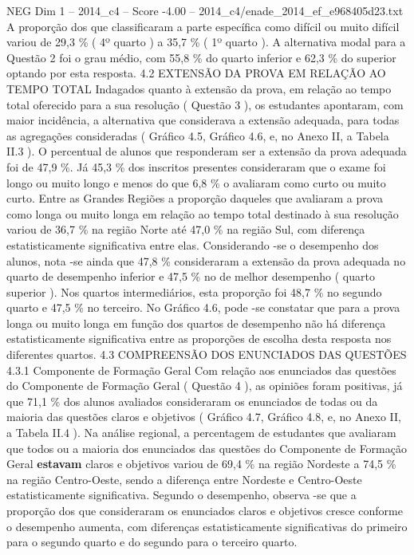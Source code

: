 \begin{textsample}{NEG Dim 1 – 2014\_c4 – Score -4.00 – 2014\_c4/enade\_2014\_ef\_e968405d23.txt}
A proporção dos que classificaram a parte específica como difícil ou muito difícil variou de 29,3 \% ( 4º quarto ) a 35,7 \% ( 1º quarto ).
A alternativa modal para a Questão 2 foi o grau médio, com 55,8 \% do quarto inferior e 62,3 \% do superior optando por esta resposta. 4.2 EXTENSÃO DA PROVA EM RELAÇÃO AO TEMPO TOTAL Indagados quanto à extensão da prova, em relação ao tempo total oferecido para a sua resolução ( Questão 3 ), os estudantes apontaram, com maior incidência, a alternativa que considerava a extensão adequada, para todas as agregações consideradas ( Gráfico 4.5, Gráfico 4.6, e, no Anexo II, a Tabela II.3 ).
O percentual de alunos que responderam ser a extensão da prova adequada foi de 47,9 \%.
Já 45,3 \% dos inscritos presentes consideraram que o exame foi longo ou muito longo e menos do que 6,8 \% o avaliaram como curto ou muito curto.
Entre as Grandes Regiões a proporção daqueles que avaliaram a prova como longa ou muito longa em relação ao tempo total destinado à sua resolução variou de 36,7 \% na região Norte até 47,0 \% na região Sul, com diferença estatisticamente significativa entre elas.
Considerando -se o desempenho dos alunos, nota -se ainda que 47,8 \% consideraram a extensão da prova adequada no quarto de desempenho inferior e 47,5 \% no de melhor desempenho ( quarto superior ).
Nos quartos intermediários, esta proporção foi 48,7 \% no segundo quarto e 47,5 \% no terceiro.
No Gráfico 4.6, pode -se constatar que para a prova longa ou muito longa em função dos quartos de desempenho não há diferença estatisticamente significativa entre as proporções de escolha desta resposta nos diferentes quartos. 4.3 COMPREENSÃO DOS ENUNCIADOS DAS QUESTÕES 4.3.1 Componente de Formação Geral Com relação aos enunciados das questões do Componente de Formação Geral ( Questão 4 ), as opiniões foram positivas, já que 71,1 \% dos alunos avaliados consideraram os enunciados de todas ou da maioria das questões claros e objetivos ( Gráfico 4.7, Gráfico 4.8, e, no Anexo II, a Tabela II.4 ).
Na análise regional, a percentagem de estudantes que avaliaram que todos ou a maioria dos enunciados das questões do Componente de Formação Geral \textbf{estavam} claros e objetivos variou de 69,4 \% na região Nordeste a 74,5 \% na região Centro-Oeste, sendo a diferença entre Nordeste e Centro-Oeste estatisticamente significativa.
Segundo o desempenho, observa -se que a proporção dos que consideraram os enunciados claros e objetivos cresce conforme o desempenho aumenta, com diferenças estatisticamente significativas do primeiro para o segundo quarto e do segundo para o terceiro quarto.

\end{textsample}

